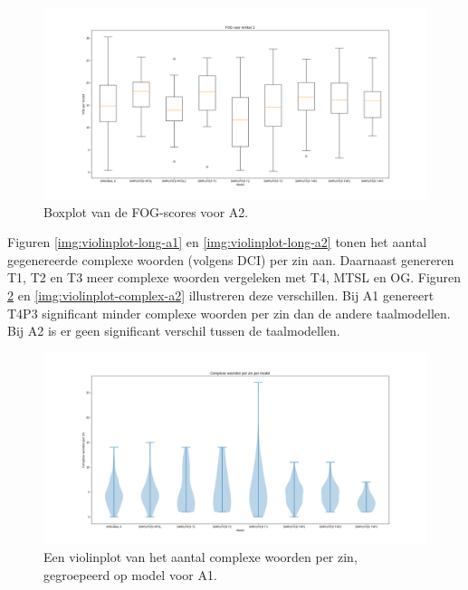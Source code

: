\begin{figure}
	\includegraphics[width=\linewidth]{img/boxplot-fog-a2.png}
	\caption{Boxplot van de FOG-scores voor A2.}
	\label{img:boxplot-fog-a2}
\end{figure}

Figuren \ref{img:violinplot-long-a1} en \ref{img:violinplot-long-a2} tonen het aantal gegenereerde complexe woorden (volgens DCI) per zin aan. Daarnaast genereren T1, T2 en T3 meer complexe woorden vergeleken met T4, MTSL en OG. Figuren \ref{img:violinplot-complex-a1} en \ref{img:violinplot-complex-a2} illustreren deze verschillen. Bij A1 genereert T4P3 significant minder complexe woorden per zin dan de andere taalmodellen. Bij A2 is er geen significant verschil tussen de taalmodellen.

\begin{figure}[H]
	\includegraphics[width=\linewidth]{img/violinplot-complex-a1.png}
	\caption{Een violinplot van het aantal complexe woorden per zin, gegroepeerd op model voor A1.}
	\label{img:violinplot-complex-a1}
\end{figure}


